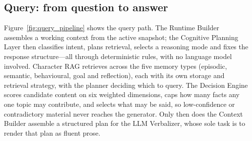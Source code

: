 \documentclass[conference]{IEEEtran}
\begin{document}
\subsection{Query: from question to answer}
Figure~\ref{fig:query_pipeline} shows the query path. The Runtime Builder assembles a working context from the active snapshot; the Cognitive Planning Layer then classifies intent, plans retrieval, selects a reasoning mode and fixes the response structure---all through deterministic rules, with no language model involved. Character RAG retrieves across the five memory types (episodic, semantic, behavioural, goal and reflection), each with its own storage and retrieval strategy, with the planner deciding which to query. The Decision Engine scores candidate content on six weighted dimensions, caps how many facts any one topic may contribute, and selects what may be said, so low-confidence or contradictory material never reaches the generator. Only then does the Context Builder assemble a structured plan for the LLM Verbalizer, whose sole task is to render that plan as fluent prose.
\end{document}
